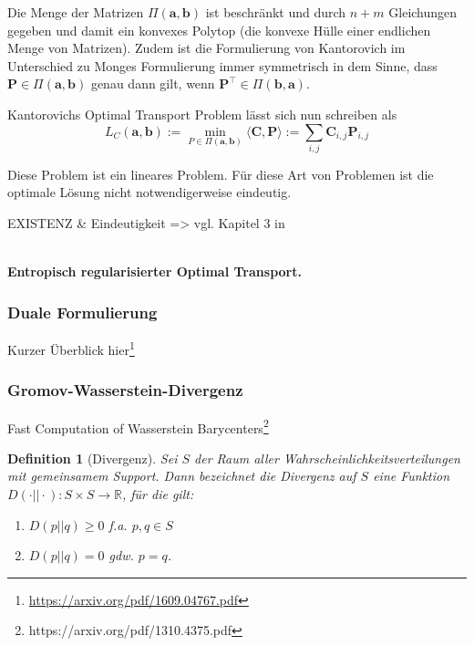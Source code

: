 \documentclass[twoside, 11pt,a4paper]{article}
\newtheorem{definition}[theorem]{Definition}
\numberwithin{equation}{section}
\begin{document}
	Die Menge der Matrizen $\Pi(\boldsymbol{a}, \boldsymbol{b})$ ist beschränkt und durch $n+m$ Gleichungen gegeben und damit ein konvexes Polytop (die konvexe Hülle einer endlichen Menge von Matrizen). Zudem ist die Formulierung von Kantorovich im Unterschied zu Monges Formulierung immer symmetrisch in dem Sinne, dass $\boldsymbol{P} \in \Pi (\boldsymbol{a}, \boldsymbol{b})$ genau dann gilt, wenn $\boldsymbol{P}^\top \in \Pi (\boldsymbol{b}, \boldsymbol{a})$.
	
	Kantorovichs Optimal Transport Problem lässt sich nun schreiben als 
	\begin{equation}
		L_C(\boldsymbol{a}, \boldsymbol{b}) := \min_{P \in \Pi(\boldsymbol{a}, \boldsymbol{b})} \langle \boldsymbol{C}, \boldsymbol{P} \rangle := \sum_{i,j}{\boldsymbol{C}_{i,j}\boldsymbol{P}_{i,j}}
	\end{equation}
	
	Diese Problem ist ein lineares Problem. Für diese Art von Problemen ist die optimale Lösung nicht notwendigerweise eindeutig.
	
	EXISTENZ \& Eindeutigkeit => vgl. Kapitel 3 in \cite{computationalOT}
	
	
	\\ \noindent \textbf{Entropisch regularisierter Optimal Transport.} 
	
	\subsubsection{Duale Formulierung}
	Kurzer Überblick hier\footnote{\url{https://arxiv.org/pdf/1609.04767.pdf}}
	\subsubsection{Gromov-Wasserstein-Divergenz}
	Fast Computation of Wasserstein Barycenters\footnote{https://arxiv.org/pdf/1310.4375.pdf}
	\begin{definition}[Divergenz]
		Sei $S$ der Raum aller Wahrscheinlichkeitsverteilungen mit gemeinsamem Support. Dann bezeichnet die Divergenz auf $S$ eine Funktion $D(\cdot || \cdot):S \times S \to \mathbb{R}$, für die gilt:
		\begin{enumerate}
			\item $D(p || q) \geq 0$ f.a. $p,q \in S$\\
			\item $D(p || q) = 0$ gdw. $p = q$.
		\end{enumerate}
	\end{definition}
\end{document}
